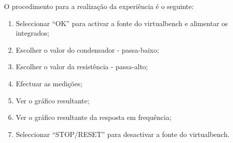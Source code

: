 O procedimento para a realização da experiência é o seguinte:
\begin{enumerate}
	\item Seleccionar ``OK'' para activar a fonte do \acrshort{virtualbench} e alimentar os integrados;
	\item Escolher o valor do condensador - passa-baixo;
	\item Escolher o valor da resistência - passa-alto;
	\item Efectuar as medições;
	\item Ver o gráfico resultante;
	\item Ver o gráfico resultante da resposta em frequência;
	\item Seleccionar ``STOP/RESET'' para desactivar a fonte do \acrshort{virtualbench}.
\end{enumerate}
